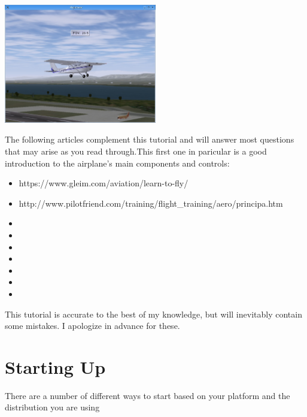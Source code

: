 \begin{center}
\includegraphics[width=0.5\textwidth]{img/tut_1}
\end{center}
    
The following articles complement this tutorial and will answer most questions
that may arise as you read through.This first one in paricular is a good
introduction to the airplane's main components and controls:
\begin{itemize}
	\item {}    {https://www.gleim.com/aviation/learn-to-fly/}
	\item {}    {http://www.pilotfriend.com/training/flight\_training/aero/principa.htm}
	\item {}
	\item {}
	\item {}
	\item {}
	\item {}
	\item {}
	\item {}
\end{itemize}

This tutorial is accurate to the best of my knowledge, but will inevitably
contain some mistakes. I apologize in advance for these.

\section{Starting Up}

There are a number of different ways to start \FlightGear{} based on your
platform and the distribution you are using

